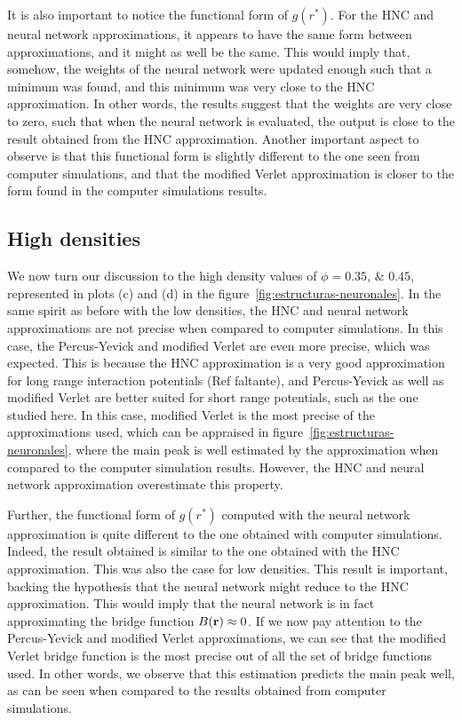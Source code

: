 It is also important to notice the functional form of $g(r^*)$. For the HNC and neural
network approximations, it appears to have the same form between approximations, and it 
might as well be the same. This would imply that, somehow, the weights of the neural network
were updated enough such that a minimum was found, and this minimum was very close to the
HNC approximation. In other words, the results suggest that the weights are very close to
zero, such that when the neural network is evaluated, the output is close to the
result obtained from the HNC approximation.
Another important aspect to observe is that this functional form is slightly different
to the one seen from computer simulations, and that the modified Verlet approximation is 
closer to the form found in the computer simulations results.

\subsection{High densities}
We now turn our discussion to the high density values of $\phi=\numlist{0.35; 0.45}$,
represented in plots (c) and (d) in the figure~\ref{fig:estructuras-neuronales}.
In the same spirit as before with the low densities, the HNC and neural network 
approximations are not precise when compared to computer simulations. In this case,
the Percus-Yevick and modified Verlet are even more precise, which was expected.
This is because the HNC approximation is a very good approximation for long range
interaction potentials (Ref faltante), and Percus-Yevick as well as modified Verlet are 
better suited for short range potentials, such as the one studied here.
In this case, modified Verlet is the most precise of the approximations used, which
can be appraised in figure~\ref{fig:estructuras-neuronales}, where the main peak
is well estimated by the approximation when compared to the computer simulation
results. However, the HNC and neural network approximation overestimate this property.

Further, the functional form of $g(r^*)$ computed with the neural network approximation 
is quite different to the one obtained with computer simulations. Indeed, the result
obtained is similar to the one obtained with the HNC approximation. This was also the
case for low densities. This result is important, backing the hypothesis that the
neural network might reduce to the HNC approximation.
This would imply that the neural network is in fact approximating the bridge function
$B(\mathbf{r}) \approx 0$. If we now pay attention to the Percus-Yevick and modified Verlet
approximations, we can see that the modified Verlet bridge function is the most precise
out of all the set of bridge functions used. In other words, we observe that this
estimation predicts the main peak well, as can be seen when compared to the results
obtained from computer simulations.

